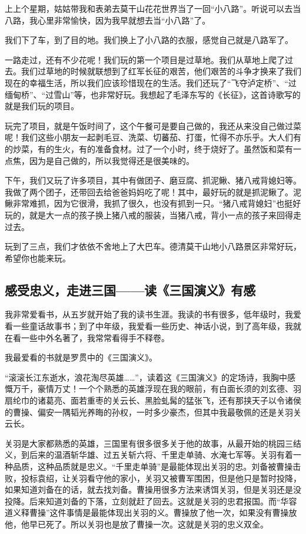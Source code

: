 \documentclass[UTF8,a4paper,titlepage,twoside,10.5pt]{article}
\begin{document}
上上个星期，姑姑带我和表弟去莫干山花花世界当了一回“小八路”。听说可以去当八路，我心里非常愉快，因为我早就想去当“小八路”了。

我们下了车，到了目的地。我们换上了小八路的衣服，感觉自己就是八路军了。

一路走过，还有不少花呢！我们玩的第一个项目是过草地。我们从草地上爬了过去。我们过草地的时候就联想到了红军长征的艰苦，他们艰苦的斗争才换来了我们现在的幸福生活，所以我们应该珍惜现在的生活。我们还玩了“飞夺泸定桥”、“过缅甸桥”、“过雪山”等，也非常好玩。我想起了毛泽东写的《长征》，这首诗歌写的就是我们玩的项目。

玩完了项目，就是午饭时间了，这个午餐可是要自己做的，我还从来没自己做过菜呢！我们这些小朋友一起剥毛豆、洗菜、切蕃茄、打蛋，忙得不亦乐乎。大人们有的炒菜，有的生火，有的准备食材。过了一个小时，终于烧好了。虽然饭和菜有一点焦，因为是自己做的，所以我觉得还是很美味的。

下午，我们又玩了许多项目，其中有做团子、磨豆腐、抓泥鳅、猪八戒背媳妇等。我做了两个团子，还带回去给爸爸妈妈吃了呢！其中，最好玩的就是抓泥鳅了。泥鳅非常难抓，因为它很滑，我抓了很久，也没有抓到一只。“猪八戒背媳妇”也挺好玩的，就是大一点的孩子换上猪八戒的服装，当猪八戒，背小一点的孩子来回得走过去。

玩到了三点，我们才依依不舍地上了大巴车。德清莫干山地小八路景区非常好玩，希望你也能来玩。

\subsection{感受忠义，走进三国——读《三国演义》有感}
\label{sec:orgd4e9080}

我非常爱看书，从五岁就开始了我的读书生涯。我读的书有很多，低年级时，我爱看一些童话故事书；到了中年级，我爱看一些历史、神话小说，到了高年级，我就在看一些中外名著了，我常常看得手不释卷。

我最爱看的书就是罗贯中的《三国演义》。

“滚滚长江东逝水，浪花淘尽英雄……”，读着这《三国演义》的定场诗，我胸中感慨万千，豪情万丈！一个个熟悉的英雄浮现在我的眼前，有白面长须的刘玄德、羽扇纶巾的诸葛亮、面若重枣的关云长、黑脸虬髯的猛张飞，还有那挟天子以令诸侯的曹操、偏安一隅韬光养晦的孙权，一时多少豪杰，但其中我最敬佩的还是关羽关云长。

关羽是大家都熟悉的英雄，三国里有很多很多关于他的故事，从最开始的桃园三结义，到后来的温酒斩华雄、过五关斩六将、千里走单骑、水淹七军等。关羽有着一种品质，这种品质就是忠义。“千里走单骑”是最能体现出关羽的忠。刘备被曹操击败，投标袁绍，让关羽看守他的家小，关羽又被曹军围困，但是他只是暂时投降，如果知道刘备在的话，就去找刘备。曹操用很多方法来诱饵关羽，但是关羽还是没投降。后来知道刘备的下落，立刻就赶了回去。这就是关羽的忠君报国。而“华容道义释曹操”这件事情是最能体现出关羽的义。曹操放了他一次，如果没有曹操放他，他早已死了。所以关羽也是放了曹操一次。这就是关羽的忠义双全。
\end{document}
